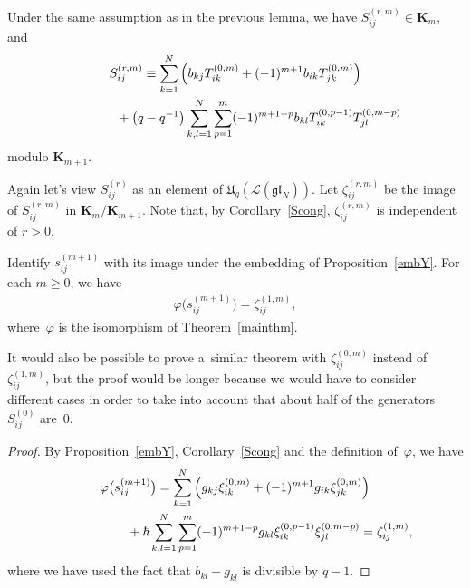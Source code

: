 \begin{corollary}
\label{Scong}
Under the same assumption as in the previous lemma, we have $S_{ij}^{(r,m)} \in \mathbf{K}_m$, and
\begin{gather*}
S_{ij}^{(r,m)} \equiv \sum\limits_{k=1}^N \left(b_{kj}T_{ik}^{(0,m)} + (-1)^{m+1} b_{ik} T_{jk}^{(0,m)}\right) \\
\hphantom{S_{ij}^{(r,m)} \equiv}{}
+
\big(q-q^{-1}\big) \sum\limits_{k,l=1}^N \sum\limits_{p=1}^m (-1)^{m+1-p} b_{kl} T_{ik}^{(0,p-1)} T_{jl}^{(0,m-p)}
\end{gather*}
modulo $\mathbf{K}_{m+1}$.
\end{corollary}
Again let's view $S_{ij}^{(r)}$ as an element of $\mathfrak{U}_q(\mathcal{L}(\mathfrak{gl}_N))$.
Let $\zeta_{ij}^{(r,m)}$ be the image of $S_{ij}^{(r,m)}$ in $\mathbf{K}_m/\mathbf{K}_{m+1}$.
Note that, by Corollary~\ref{Scong}, $\zeta_{ij}^{(r,m)}$ is independent of $r>0$.
\begin{theorem}
\label{twUqY}
Identify $s_{ij}^{(m+1)}$ with its image under the embedding of Proposition~{\rm \ref{embY}}.
For each $m \geq 0$, we have
\begin{gather*}
\varphi\big(s_{ij}^{(m+1)}\big)=\zeta_{ij}^{(1,m)},
\end{gather*}
where~$\varphi$ is the isomorphism of Theorem~{\rm \ref{mainthm}}.
\end{theorem}

\begin{remark}
It would also be possible to prove a~similar theorem with $\zeta_{ij}^{(0,m)}$ instead of $\zeta_{ij}^{(1,m)}$, but the
proof would be longer because we would have to consider dif\/ferent cases in order to take into account that about half of
the generators $S_{ij}^{(0)}$ are~$0$.
\end{remark}

\begin{proof}
By Proposition~\ref{embY}, Corollary~\ref{Scong} and the def\/inition of~$\varphi$, we have
\begin{gather*}
\varphi\big(s_{ij}^{(m+1)}\big)=\sum\limits_{k=1}^N \left(g_{kj} \xi_{ik}^{(0,m)} + (-1)^{m+1} g_{ik} \xi_{jk}^{(0,m)}\right)
\\
\hphantom{\varphi\big(s_{ij}^{(m+1)}\big)=}{}
+ \hbar \sum\limits_{k,l=1}^N \sum\limits_{p=1}^m (-1)^{m+1-p} g_{kl} \xi_{ik}^{(0,p-1)} \xi_{jl}^{(0,m-p)}
  = \zeta_{ij}^{(1,m)},
\end{gather*}
where we have used the fact that $b_{kl}-g_{kl}$ is divisible by $q-1$.
\end{proof}

